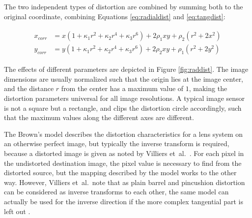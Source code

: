 The two independent types of distortion are combined by summing both to the original coordinate, combining Equations \ref{eq:radialdist} and \ref{eq:tangdist}:

\begin{align} \label{eq:bothdist} \begin{split}
	x_{corr} &= x (1 + \kappa_1 r^2 + \kappa_2 r^4 + \kappa_3 r^6) + 2 \rho_1 x y + \rho_2 (r^2 + 2 x^2)\\
	y_{corr} &= y (1 + \kappa_1 r^2 + \kappa_2 r^4 + \kappa_3 r^6) + 2 \rho_2 x y + \rho_1 (r^2 + 2 y^2)
\end{split} \end{align}

The effects of different parameters are depicted in Figure \ref{fig:raddist}.
The image dimensions are usually normalized such that the origin lies at the image center, and the distance $r$ from the center has a maximum value of $1$, making the distortion parameters universal for all image resolutions.
A typical image sensor is not a square but a rectangle, and clips the distortion circle accordingly, such that the maximum values along the different axes are different.


The Brown's model describes the distortion characteristics for a lens system on an otherwise perfect image, but typically the inverse transform is required, because a distorted image is given as noted by Villiers et~al.\ \cite{villiers2008centi}. %
For each pixel in the undistorted destination image, the pixel value is necessary to find from the distorted source, but the mapping described by the model works to the other way.
However, Villiers et~al.\ note that as plain barrel and pincushion distortion can be considered as inverse transforms to each other, the same model can actually be used for the inverse direction if the more complex tangential part is left out \cite{villiers2008centi}.

